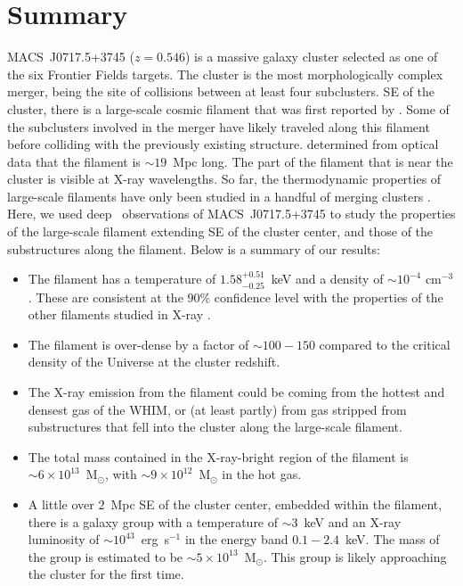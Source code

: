 \section{Summary}
\label{sec:Summary}

MACS~J0717.5+3745 ($z=0.546$) is a massive galaxy cluster selected as one of the six Frontier Fields targets. The cluster is the most morphologically complex merger, being the site of collisions between at least four subclusters. SE of the cluster, there is a large-scale cosmic filament that was first reported by \citet{Ebeling2004}. Some of the subclusters involved in the merger have likely traveled along this filament before colliding with the previously existing structure. \citet{Jauzac2012} determined from optical data that the filament is $\sim 19$~Mpc long. The part of the filament that is near the cluster is visible at X-ray wavelengths. So far, the thermodynamic properties of large-scale filaments have only been studied in a handful of merging clusters \citep{Werner2008, Eckert2015, Bulbul2016}. Here, we used deep \chandra\ observations of MACS~J0717.5+3745 to study the properties of the large-scale filament extending SE of the cluster center, and those of the substructures along the filament. Below is a summary of our results:

\begin{itemize}
	\item The filament has a temperature of $1.58_{-0.25}^{+0.51}$~keV and a density of $\sim 10^{-4}$ cm$^{-3}$. These are consistent at the $90\%$ confidence level with the properties of the other filaments studied in X-ray \citep{Werner2008, Eckert2015, Bulbul2016}.
	\item The filament is over-dense by a factor of $\sim 100-150$ compared to the critical density of the Universe at the cluster redshift.
	\item The X-ray emission from the filament could be coming from the hottest and densest gas of the WHIM, or (at least partly) from gas stripped from substructures that fell into the cluster along the large-scale filament.
	\item The total mass contained in the X-ray-bright region of the filament is $\sim 6\times 10^{13}$~M$_\odot$, with $\sim 9\times 10^{12}$~M$_\odot$ in the hot gas.
	\item A little over $2$~Mpc SE of the cluster center, embedded within the filament, there is a galaxy group with a temperature of $\sim 3$~keV and an X-ray luminosity of $\sim 10^{43}$~erg~s$^{-1}$ in the energy band $0.1 - 2.4$~keV. The mass of the group is estimated to be $\sim 5\times 10^{13}$~M$_\odot$. This group is likely approaching the cluster for the first time.
\end{itemize}
